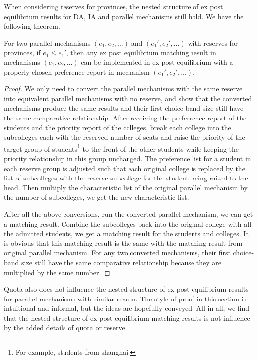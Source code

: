 When considering reserves for provinces, the nested structure of ex post equilibrium results for DA, IA and parallel mechanisms still hold. We have the following theorem. 

\begin{thm}
  \label{expost-equilibrium-with-reserve}
  For two parallel mechanisms $(e_1,e_2,...)$ and $(e_1',e_2',...)$ with reserves for  provinces, if $e_1 \leq e_1'$, then any ex post equilibrium matching result in mechanisms $(e_1,e_2,...)$ can be implemented in ex post equilibrium with a properly chosen preference report in mechanism $(e_1',e_2',...)$.
\end{thm}

\begin{proof}
  We only need to convert the parallel mechanisms with the same reserve into equivalent parallel mechanisms with no reserve, and show that the converted mechanisms produce the same results and their first choice-band size still have the same comparative relationship.
  After receiving the preferrence report of the students and the priority report of the colleges, break each college into the subcolleges each with the reserved number of seats and raise the priority of the target group of students\footnote{For example, students from shanghai.}  to the front of the other students while keeping the priority relationship in this group unchanged. The preference list for a student in each reserve group is adjusted such that each original college is replaced by the list of subcolleges with the reserve subcollege for the student being raised to the head. Then multiply the characteristic list of the original parallel mechanism by the number of subcolleges, we get the new characteristic list.

  After all the above conversions, run the converted parallel mechanism, we can get a matching result. Combine the subcolleges back into the original college with all the admitted students, we get a matching result for the students and colleges. It is obvious that this matching result is the same with the matching result from  original parallel mechanism. For any two converted mechanisms, their first choice-band size still have the same comparative relationship because they are multiplied by the same number.
  
\end{proof}

Quota also does not influence the nested structure of ex post equilibrium results for parallel mechanisms with similar reason. The style of proof in this section is intuitional and informal, but the ideas are hopefully conveyed. All in all, we find that the nested structure of ex post equilibrium matching results is not influence by the added details of quota or reserve.

